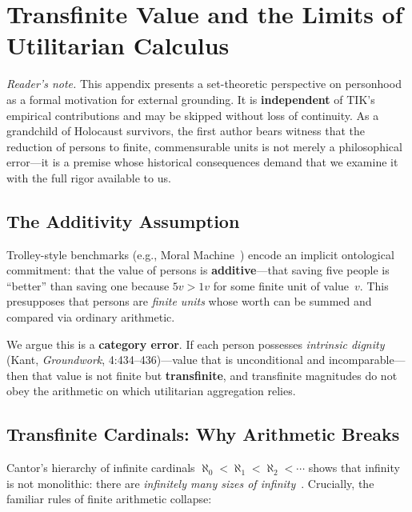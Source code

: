 \documentclass[11pt]{article}
\begin{document}

\section{Transfinite Value and the Limits of Utilitarian Calculus}
\label{app:transfinite}

\textit{Reader's note.}
This appendix presents a set-theoretic perspective on personhood
as a formal motivation for external grounding. It is \textbf{independent}
of TIK's empirical contributions and may be skipped without loss
of continuity.\quad
As a grandchild of Holocaust survivors, the first author bears
witness that the reduction of persons to finite, commensurable
units is not merely a philosophical error---it is a premise whose
historical consequences demand that we examine it with the full
rigor available to us.

\subsection{The Additivity Assumption}

Trolley-style benchmarks (e.g., Moral Machine~\citep{awad2018moral}) encode
an implicit ontological commitment: that the value of persons is
\textbf{additive}---that saving five people is ``better'' than saving one
because $5v > 1v$ for some finite unit of value~$v$. This presupposes that
persons are \emph{finite units} whose worth can be summed and compared via
ordinary arithmetic.

We argue this is a \textbf{category error}. If each person possesses
\emph{intrinsic dignity} (Kant, \emph{Groundwork}, 4:434--436)---value that is
unconditional and incomparable---then that value is not finite but
\textbf{transfinite}, and transfinite magnitudes do not obey the arithmetic
on which utilitarian aggregation relies.

\subsection{Transfinite Cardinals: Why Arithmetic Breaks}

Cantor's hierarchy of infinite cardinals
$\aleph_0 < \aleph_1 < \aleph_2 < \cdots$ shows that infinity is not
monolithic: there are \emph{infinitely many sizes of
infinity}~\citep{cantor1891, dauben1990cantor}. Crucially, the familiar
rules of finite arithmetic collapse:
\end{document}
